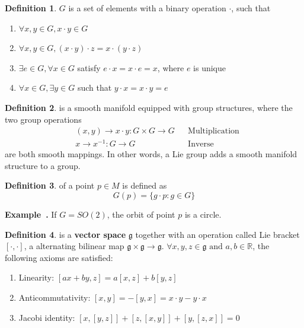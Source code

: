 \documentclass[a4paper]{article}
\theoremstyle{definition}
\newtheorem{definition}{Definition}
\theoremstyle{plain}
\newenvironment{example}[1][]{\refstepcounter{example}\par\medskip
   \noindent \textbf{Example~\theexample. #1} \rmfamily}{\medskip}
\newcounter{example}{Example}
\begin{document}
\begin{definition}
 $G$ is a set of elements with a binary operation $\cdot$, such that
\begin{enumerate}
    \item $\forall x,y\in G, x\cdot y\in G$
    \item $\forall x,y\in G, (x\cdot y)\cdot z=x\cdot( y\cdot z)$
    \item $\exists e\in G, \forall x\in G$ satisfy $e\cdot x=x\cdot e=x$, where $e$ is unique
    \item $\forall x\in G, \exists y\in G$ such that $y\cdot x=x\cdot y=e$
\end{enumerate}
\end{definition}

\begin{definition}
 is a smooth manifold equipped with group structures, where the two group operations
\begin{align*}
    &(x,y)\rightarrow x\cdot y:G\times G\rightarrow G &&\text{Multiplication}\\
    &x\rightarrow x^{-1}:G\rightarrow G  &&\text{Inverse}
\end{align*}
are both smooth mappings. In other words, a Lie group adds a smooth manifold structure to a group.
\end{definition}

\begin{definition}
 of a point $p\in M$ is defined as 
\begin{equation*}
    G(p)=\{g\cdot p:g\in G\}
\end{equation*}
\end{definition}

\begin{example}
If $G=SO(2)$, the orbit of point $p$ is a circle.
\end{example}

\begin{definition}
 is a \textbf{vector space} $\mathfrak{g}$ together with an operation called Lie bracket $[\cdot,\cdot]$, a alternating bilinear map $\mathfrak{g}\times\mathfrak{g}\rightarrow\mathfrak{g}$. $\forall x,y,z\in\mathfrak{g}\text{ and }a,b\in\mathbb{R}$, the following axioms are satisfied:
\begin{enumerate}
    \item Linearity: $[ax+by,z]=a[x,z]+b[y,z]$
    \item Anticommutativity: $[x,y]=-[y,x]=x\cdot y-y\cdot x$
    \item Jacobi identity: $[x,[y,z]]+[z,[x,y]]+[y,[z,x]]=0$
\end{enumerate}
\end{definition} 
\end{document}
